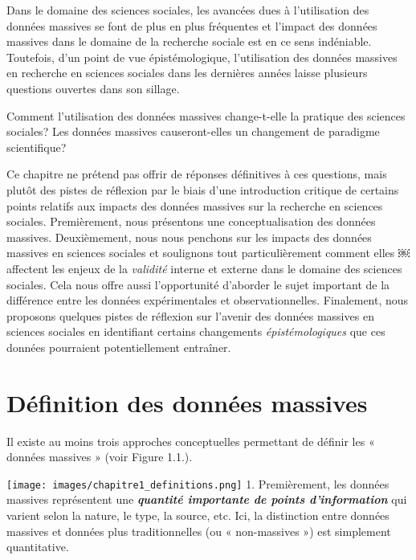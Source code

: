 \documentclass[
  letterpaper,
  DIV=11,
  numbers=noendperiod]{scrreprt}
\begin{document}
Dans le domaine des sciences sociales, les avancées dues à l'utilisation
des données massives se font de plus en plus fréquentes et l'impact des
données massives dans le domaine de la recherche sociale est en ce sens
indéniable. Toutefois, d'un point de vue épistémologique, l'utilisation
des données massives en recherche en sciences sociales dans les
dernières années laisse plusieurs questions ouvertes dans son sillage.

Comment l'utilisation des données massives change-t-elle la pratique des
sciences sociales? Les données massives causeront-elles un changement de
paradigme scientifique?

Ce chapitre ne prétend pas offrir de réponses définitives à ces
questions, mais plutôt des pistes de réflexion par le biais d'une
introduction critique de certains points relatifs aux impacts des
données massives sur la recherche en sciences sociales. Premièrement,
nous présentons une conceptualisation des données massives.
Deuxièmement, nous nous penchons sur les impacts des données massives en
sciences sociales et soulignons tout particulièrement comment elles ￼
affectent les enjeux de la \emph{validité} interne et externe dans le
domaine des sciences sociales. Cela nous offre aussi l'opportunité
d'aborder le sujet important de la différence entre les données
expérimentales et observationnelles. Finalement, nous proposons quelques
pistes de réflexion sur l'avenir des données massives en sciences
sociales en identifiant certains changements \emph{épistémologiques} que
ces données pourraient potentiellement entraîner.

\hypertarget{duxe9finition-des-donnuxe9es-massives}{%
\section*{Définition des données
massives}\label{duxe9finition-des-donnuxe9es-massives}}


Il existe au moins trois approches conceptuelles permettant de définir
les « données massives » (voir Figure 1.1.).

\texttt{[image: images/chapitre1\_definitions.png]} 1. Premièrement, les
données massives représentent une \textbf{\emph{quantité importante de
points d'information}} qui varient selon la nature, le type, la source,
etc. Ici, la distinction entre données massives et données plus
traditionnelles (ou « non-massives ») est simplement quantitative.
\end{document}
